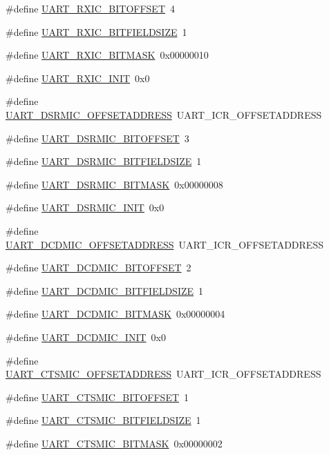 \begin{DoxyCompactItemize}
\item 
\#define \hyperlink{a00575_a4f590ee7ad89ace34ad6705a228ad994}{UART\_\-RXIC\_\-BITOFFSET}~4
\item 
\#define \hyperlink{a00575_a69c6acbf5e9489590fad4d63509214f4}{UART\_\-RXIC\_\-BITFIELDSIZE}~1
\item 
\#define \hyperlink{a00575_a6a377bbc0386ce2bc076be001beef6b9}{UART\_\-RXIC\_\-BITMASK}~0x00000010
\item 
\#define \hyperlink{a00575_a12fb7472f37d5e3dd018b8ad03751fd3}{UART\_\-RXIC\_\-INIT}~0x0
\item 
\#define \hyperlink{a00575_a6aec5a5008d3b69b723f37107410c8a6}{UART\_\-DSRMIC\_\-OFFSETADDRESS}~UART\_\-ICR\_\-OFFSETADDRESS
\item 
\#define \hyperlink{a00575_a2a15b8ef414b08b9b9e85559460406da}{UART\_\-DSRMIC\_\-BITOFFSET}~3
\item 
\#define \hyperlink{a00575_a6367eca2edef1d8ebddca71cfdf21fee}{UART\_\-DSRMIC\_\-BITFIELDSIZE}~1
\item 
\#define \hyperlink{a00575_a73a3df9111e5f2bc15f95dfd1005dc60}{UART\_\-DSRMIC\_\-BITMASK}~0x00000008
\item 
\#define \hyperlink{a00575_a7c0027fd02c4151add3753c16dbf9e62}{UART\_\-DSRMIC\_\-INIT}~0x0
\item 
\#define \hyperlink{a00575_add9fb76bd02bfdd4b4f52d5c8df33c16}{UART\_\-DCDMIC\_\-OFFSETADDRESS}~UART\_\-ICR\_\-OFFSETADDRESS
\item 
\#define \hyperlink{a00575_a1347a66d096cfc867a9771137c5c56b4}{UART\_\-DCDMIC\_\-BITOFFSET}~2
\item 
\#define \hyperlink{a00575_a68dbeaf8c2fc144f62da32271047c10b}{UART\_\-DCDMIC\_\-BITFIELDSIZE}~1
\item 
\#define \hyperlink{a00575_aaee55abd39937707a37a6a304b7748fd}{UART\_\-DCDMIC\_\-BITMASK}~0x00000004
\item 
\#define \hyperlink{a00575_a82d1a36e4570cdfd32fee2c5029bfda8}{UART\_\-DCDMIC\_\-INIT}~0x0
\item 
\#define \hyperlink{a00575_ac119e85eee85a9d1ac2739b055033985}{UART\_\-CTSMIC\_\-OFFSETADDRESS}~UART\_\-ICR\_\-OFFSETADDRESS
\item 
\#define \hyperlink{a00575_a51c8f336a3f978ebf1e0e982993f875c}{UART\_\-CTSMIC\_\-BITOFFSET}~1
\item 
\#define \hyperlink{a00575_ab7d70ff144eb705d54e6daa0e3024548}{UART\_\-CTSMIC\_\-BITFIELDSIZE}~1
\item 
\#define \hyperlink{a00575_aaf3ebfb4100aa65ae0b0f098e7f99f6e}{UART\_\-CTSMIC\_\-BITMASK}~0x00000002

\end{DoxyCompactItemize}
